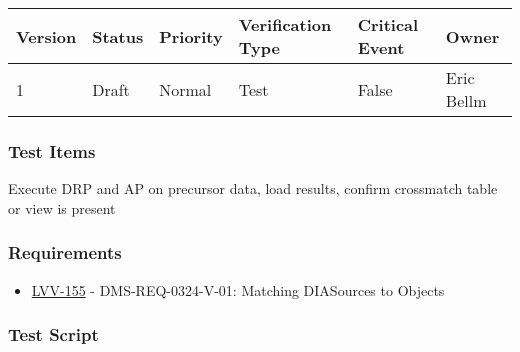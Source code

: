 \begin{longtable}[]{@{}llllll@{}}
\toprule
Version & Status & Priority & Verification Type & Critical Event &
Owner\tabularnewline
\midrule
\endhead
1 & Draft & Normal & Test & False & Eric Bellm\tabularnewline
\bottomrule
\end{longtable}

\hypertarget{test-items-34}{%
\subsubsection{Test Items}\label{test-items-34}}

Execute DRP and AP on precursor data, load results, confirm crossmatch
table or view is present

\hypertarget{requirements-35}{%
\subsubsection{Requirements}\label{requirements-35}}

\begin{itemize}
\tightlist
\item
  \href{https://jira.lsstcorp.org/browse/LVV-155}{LVV-155} -
  DMS-REQ-0324-V-01: Matching DIASources to Objects
\end{itemize}

\hypertarget{test-script-35}{%
\subsubsection{Test Script}\label{test-script-35}}

